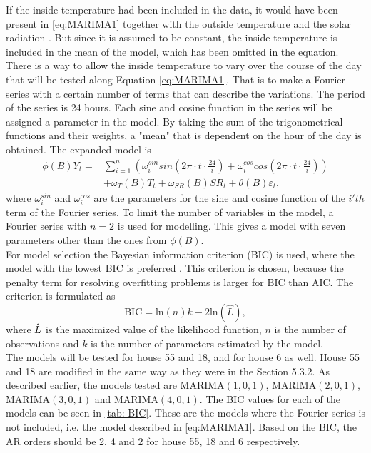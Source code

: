 \noindent If the inside temperature had been included in the data, it would have been present in \cref{eq:MARIMA1} together with the outside temperature and the solar radiation \cite{peder}. But since it is assumed to be constant, the inside temperature is included in the mean of the model, which has been omitted in the equation. There is a way to allow the inside temperature to vary over the course of the day that will be tested along Equation \ref{eq:MARIMA1}. That is to make a Fourier series with a certain number of terms that can describe the variations. The period of the series is 24 hours. Each sine and cosine function in the series will be assigned a parameter in the model. By taking the sum of the trigonometrical functions and their weights, a "mean" that is dependent on the hour of the day is obtained. The expanded model is
\begin{align}
    \phi (B) Y_t = &\sum_{i=1}^n \left(\omega^{sin}_i sin\left(2\pi\cdot t \cdot \frac{24}{i}\right) + \omega^{cos}_i cos\left(2\pi\cdot t \cdot \frac{24}{i}\right)\right) \nonumber\\ & + \omega_{T}(B)T_t + \omega_{SR}(B)SR_t + \theta (B) \varepsilon_t ,
    \label{eq:MARIMA2}
\end{align}
where $\omega^{sin}_i$ and $\omega^{cos}_i$ are the parameters for the sine and cosine function of the $i'th$ term of the Fourier series. To limit the number of variables in the model, a Fourier series with $n=2$ is used for modelling. This gives a model with seven parameters other than the ones from $\phi(B)$. \\



\noindent For model selection the Bayesian information criterion (BIC) is used, where the model with the lowest BIC is preferred \cite{BIC}. This criterion is chosen, because the penalty term for resolving overfitting problems is larger for BIC than AIC. The criterion is formulated as
\begin{equation}
    \text{BIC} = \text{ln}(n)k - 2\text{ln}(\widehat{L}),
\end{equation}
where $\Hat{L}$ is the maximized value of the likelihood function, $n$ is the number of observations and $k$ is the number of parameters estimated by the model. \\

\noindent The models will be tested for house 55 and 18, and for house 6 as well. House 55 and 18 are modified in the same way as they were in the Section 5.3.2. As described earlier, the models tested are MARIMA$(1,0,1)$, MARIMA$(2,0,1)$, MARIMA$(3,0,1)$ and MARIMA$(4,0,1)$. The BIC values for each of the models can be seen in \cref{tab: BIC}. These are the models where the Fourier series is not included, i.e. the model described in \cref{eq:MARIMA1}. Based on the BIC, the AR orders should be 2, 4 and 2 for house 55, 18 and 6 respectively.

